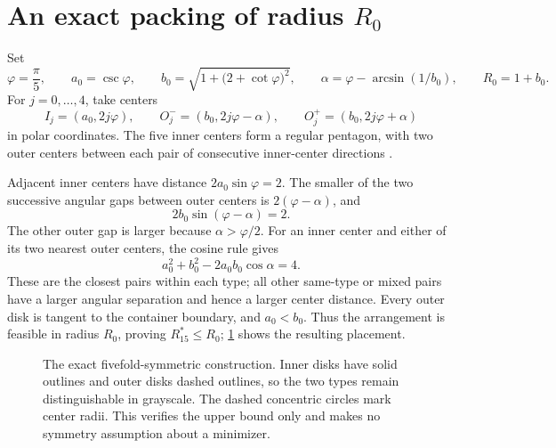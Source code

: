 \documentclass[11pt]{article}
\theoremstyle{definition}
\begin{document}
\section{An exact packing of radius \texorpdfstring{$R_0$}{R0}}\label{sec:construction}

Set
\[
 \varphi=\frac\pi5,\qquad a_0=\csc\varphi,\qquad
 b_0=\sqrt{1+\bigl(2+\cot\varphi\bigr)^2},\qquad
 \alpha=\varphi-\arcsin(1/b_0),\qquad R_0=1+b_0.
\]
For $j=0,\ldots,4$, take centers
\[
 I_j=(a_0,2j\varphi),\qquad
 O_j^-=(b_0,2j\varphi-\alpha),\qquad
 O_j^+=(b_0,2j\varphi+\alpha)
\]
in polar coordinates. The five inner centers form a regular pentagon, with two outer centers between each pair of consecutive inner-center directions \cite{Packomania}.

Adjacent inner centers have distance $2a_0\sin\varphi=2$. The smaller of the two successive angular gaps between outer centers is $2(\varphi-\alpha)$, and
\[
 2b_0\sin(\varphi-\alpha)=2.
\]
The other outer gap is larger because $\alpha>\varphi/2$. For an inner center and either of its two nearest outer centers, the cosine rule gives
\[
 a_0^2+b_0^2-2a_0b_0\cos\alpha=4.
\]
These are the closest pairs within each type; all other same-type or mixed pairs have a larger angular separation and hence a larger center distance. Every outer disk is tangent to the container boundary, and $a_0<b_0$. Thus the arrangement is feasible in radius $R_0$, proving $R_{15}^*\le R_0$; \cref{fig:construction} shows the resulting placement.

\begin{figure}[htbp]
\centering
{}
\caption{The exact fivefold-symmetric construction. Inner disks have solid outlines and outer disks dashed outlines, so the two types remain distinguishable in grayscale. The dashed concentric circles mark center radii. This verifies the upper bound only and makes no symmetry assumption about a minimizer.}
\label{fig:construction}
\end{figure}
\end{document}
